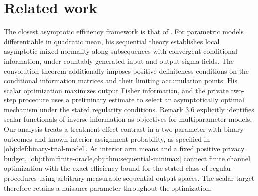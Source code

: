 \section{Related work}

The closest asymptotic efficiency framework is that of \citet[Theorems 3.3 and 3.5, Remark 3.6, and Section 4]{Steinberger2024}. For parametric models differentiable in quadratic mean, his sequential theory establishes local asymptotic mixed normality along subsequences with convergent conditional information, under countably generated input and output sigma-fields. The convolution theorem additionally imposes positive-definiteness conditions on the conditional information matrices and their limiting accumulation points. His scalar optimization maximizes output Fisher information, and the private two-step procedure uses a preliminary estimate to select an asymptotically optimal mechanism under the stated regularity conditions. Remark 3.6 explicitly identifies scalar functionals of inverse information as objectives for multiparameter models. %
Our analysis treats a treatment-effect contrast in a two-parameter  with binary outcomes and known interior assignment probability, as specified in \cref{obj:def:binary-trial-model}. At interior arm means and a fixed positive privacy budget, \cref{obj:thm:finite-oracle,obj:thm:sequential-minimax} connect finite channel optimization with the exact efficiency bound for the stated class of regular procedures using arbitrary measurable sequential output spaces. The scalar target therefore retains a nuisance parameter throughout the optimization.

